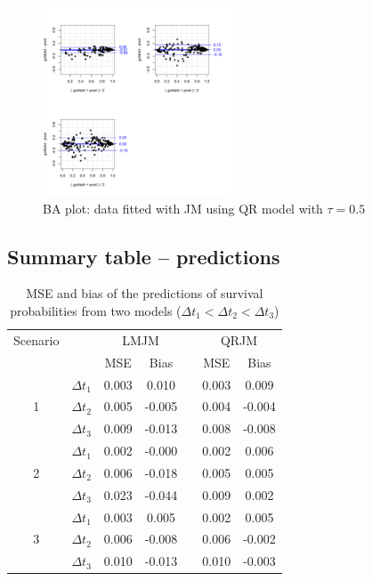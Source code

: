 \documentclass{article}
\begin{document}
\begin{figure}[H]
\centering
\includegraphics[width=0.5\textwidth]{ba_QRJM_normaldata.pdf}
\caption{BA plot: data fitted with JM using QR model with $\tau=0.5$}
\end{figure}





\subsection{Summary table -- predictions}

\begin{table}[H]
\centering
\caption{MSE and bias of the predictions of survival probabilities from two models ($\Delta t_1<\Delta t_2<\Delta t_3$)}
\begin{tabular}{ccccccc}
\hline
Scenario & & \multicolumn{2}{c}{LMJM} & & \multicolumn{2}{c}{QRJM} \\
\cline{3-4}\cline{6-7}
 & & MSE & Bias & & MSE & Bias \\
\hline
\multirow{3}{*}{1} & $\Delta t_1$ & 0.003 &  0.010 & & 0.003 & 0.009 \\
& $\Delta t_2$ & 0.005 & -0.005 & & 0.004 & -0.004 \\
& $\Delta t_3$ & 0.009 & -0.013 & & 0.008 & -0.008 \\
\hline
\multirow{3}{*}{2} & $\Delta t_1$ & 0.002 & -0.000 & & 0.002 & 0.006 \\
& $\Delta t_2$ & 0.006 & -0.018 & & 0.005 & 0.005 \\
& $\Delta t_3$ & 0.023 & -0.044 & & 0.009 & 0.002 \\
\hline
\multirow{3}{*}{3} & $\Delta t_1$ & 0.003 &  0.005 & & 0.002 &  0.005 \\
& $\Delta t_2$ & 0.006 & -0.008 & & 0.006 & -0.002 \\
& $\Delta t_3$ & 0.010 &-0.013 & & 0.010 & -0.003 \\
\hline
\end{tabular}
\end{table}
\end{document}
